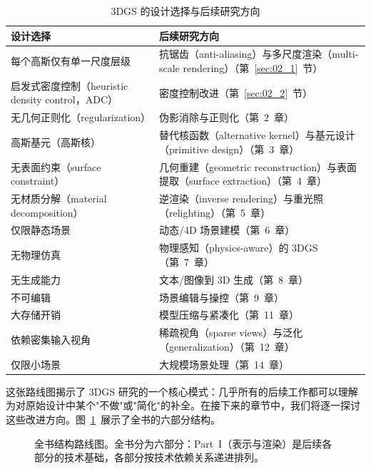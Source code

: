 \begin{table}[htbp]
\centering
\caption{3DGS 的设计选择与后续研究方向}
\label{tab:design_research}
\begin{tabularx}{\textwidth}{@{}l@{\hspace{1em}}X@{}}
\toprule
\textbf{设计选择} & \textbf{后续研究方向} \\
\midrule
每个高斯仅有单一尺度层级 & 抗锯齿（anti-aliasing）与多尺度渲染（multi-scale rendering）（第~\ref{sec:02_1}~节） \\
启发式密度控制（heuristic density control，ADC） & 密度控制改进（第~\ref{sec:02_2}~节） \\
无几何正则化（regularization） & 伪影消除与正则化（第~2~章） \\
高斯基元（高斯核） & 替代核函数（alternative kernel）与基元设计（primitive design）（第~3~章） \\
无表面约束（surface constraint） & 几何重建（geometric reconstruction）与表面提取（surface extraction）（第~4~章） \\
无材质分解（material decomposition） & 逆渲染（inverse rendering）与重光照（relighting）（第~5~章） \\
仅限静态场景 & 动态/4D 场景建模（第~6~章） \\
无物理仿真 & 物理感知（physics-aware）的 3DGS（第~7~章） \\
无生成能力 & 文本/图像到 3D 生成（第~8~章） \\
不可编辑 & 场景编辑与操控（第~9~章） \\
大存储开销 & 模型压缩与紧凑化（第~11~章） \\
依赖密集输入视角 & 稀疏视角（sparse views）与泛化（generalization）（第~12~章） \\
仅限小场景 & 大规模场景处理（第~14~章） \\
\bottomrule
\end{tabularx}
\end{table}

这张路线图揭示了 3DGS 研究的一个核心模式：几乎所有的后续工作都可以理解为对原始设计中某个"不做"或"简化"的补全。在接下来的章节中，我们将逐一探讨这些改进方向。图~\ref{fig:01_book_roadmap}~展示了全书的六部分结构。

\begin{figure}[p]
\centering
\resizebox{!}{0.85\textheight}{}
\caption{全书结构路线图。全书分为六部分：Part~I（表示与渲染）是后续各部分的技术基础，各部分按技术依赖关系递进排列。}
\label{fig:01_book_roadmap}
\end{figure}

